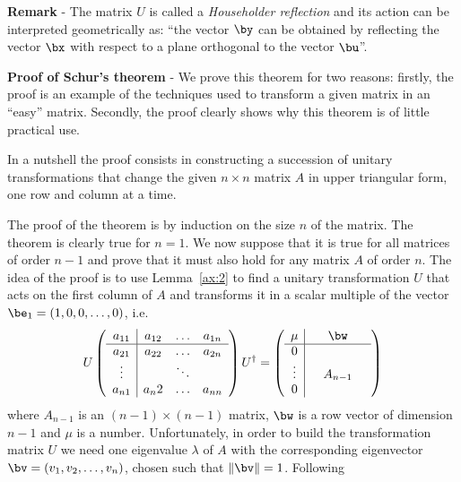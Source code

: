 \noindent
\textbf{Remark} - The matrix $U$ is called a \textit{Householder
  reflection} and its action can be interpreted geometrically as:
``the vector $\by$ can be obtained by reflecting the vector $\bx$ with
respect to a plane orthogonal to the vector $\bu$''.

\noindent
\textbf{Proof of Schur's theorem} - We prove this theorem for two
reasons: firstly, the proof is an example of the techniques used to
transform a given matrix in an ``easy'' matrix.  Secondly, the proof
clearly shows why this theorem is of little practical use.

In a nutshell the proof consists in constructing a succession of
unitary transformations that change the given $n \times n$ matrix $A$
in upper triangular form, one row and column at a time.

The proof of the theorem is by induction on the size $n$ of the
matrix.  The theorem is clearly true for $n=1$.  We now suppose that
it is true for all matrices of order $n-1$ and prove that it must also
hold for any matrix $A$ of order $n$.  The idea of the proof is to use
Lemma~\ref{ax:2} to find a unitary transformation $U$ that acts on the
first column of $A$ and transforms it in a scalar multiple of the
vector $\be_1 = (1,0,0,\ldots,0)$, i.e.
%
\begin{equation}
  U \left ( \begin{array}{c|ccc}
      a_{1 1} & a_{1 2} & \ldots & a_{1 n} \\ \hline
      a_{2 1} & a_{2 2} & \ldots & a_{2 n} \\
      \vdots & & \ddots & \\
      a_{n 1} & a{_n 2} & \ldots & a_{n n} \\
    \end{array} \right ) U^{\dagger} =
  \left ( \begin{array}{c|ccc}
      \mu & & \bw & \\ \hline
      0 & & & \\
      \vdots & & A_{n-1} & \\
      0 & & & \\
    \end{array} \right )
  \label{eq:Ev13}
\end{equation}
%
where $A_{n-1}$ is an $(n-1) \times (n-1)$ matrix, $\bw$ is a row
vector of dimension $n-1$ and $\mu$ is a number.  Unfortunately, in
order to build the transformation matrix $U$ we need one eigenvalue
$\lambda$ of $A$ with the corresponding eigenvector $\bv=(v_1, v_2,
\ldots, v_n)$, chosen such that $\| \bv \|=1$.  Following
